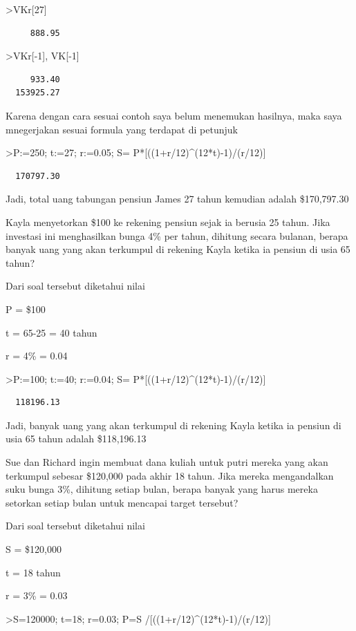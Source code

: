 \documentclass[
]{book}
\begin{document}
\textgreater VKr{[}27{]}

\begin{verbatim}
     888.95 
\end{verbatim}

\textgreater VKr{[}-1{]}, VK{[}-1{]}

\begin{verbatim}
     933.40 
  153925.27 
\end{verbatim}

Karena dengan cara sesuai contoh saya belum menemukan hasilnya, maka saya mnegerjakan sesuai formula yang terdapat di petunjuk

\textgreater P:=250; t:=27; r:=0.05; S= P*{[}((1+r/12)\^{}(12*t)-1)/(r/12){]}

\begin{verbatim}
  170797.30 
\end{verbatim}

Jadi, total uang tabungan pensiun James 27 tahun kemudian adalah \$170,797.30

Kayla menyetorkan \$100 ke rekening pensiun sejak ia berusia 25 tahun. Jika investasi ini menghasilkan bunga 4\% per tahun, dihitung secara bulanan, berapa banyak uang yang akan terkumpul di rekening Kayla ketika ia pensiun di usia 65 tahun?

Dari soal tersebut diketahui nilai

P = \$100

t = 65-25 = 40 tahun

r = 4\% = 0.04

\textgreater P:=100; t:=40; r:=0.04; S= P*{[}((1+r/12)\^{}(12*t)-1)/(r/12){]}

\begin{verbatim}
  118196.13 
\end{verbatim}

Jadi, banyak uang yang akan terkumpul di rekening Kayla ketika ia pensiun di usia 65 tahun adalah \$118,196.13

Sue dan Richard ingin membuat dana kuliah untuk putri mereka yang akan terkumpul sebesar \$120,000 pada akhir 18 tahun. Jika mereka mengandalkan suku bunga 3\%, dihitung setiap bulan, berapa banyak yang harus mereka setorkan setiap bulan untuk mencapai target tersebut?

Dari soal tersebut diketahui nilai

S = \$120,000

t = 18 tahun

r = 3\% = 0.03

\textgreater S=120000; t=18; r=0.03; P=S /{[}((1+r/12)\^{}(12*t)-1)/(r/12){]}
\end{document}
